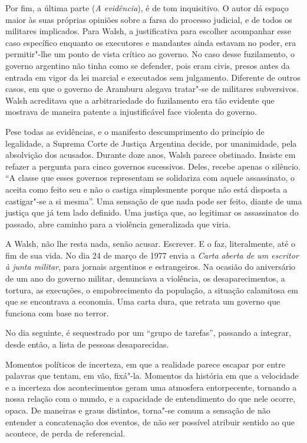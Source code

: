 Por fim, a última parte (\emph{A evidência}), é de tom inquisitivo. O
autor dá espaço maior às suas próprias opiniões sobre a farsa do
processo judicial, e de todos os militares implicados. Para Walsh, a
justificativa para escolher acompanhar esse caso específico enquanto os
executores e mandantes ainda estavam no poder, era permitir"-lhe
um ponto de vista crítico ao governo. No caso desse fuzilamento, o
governo argentino não tinha como se defender, pois eram civis,
presos antes da entrada em vigor da lei marcial e executados sem
julgamento. Diferente de outros casos, em que o governo de Aramburu
alegava tratar"-se de militares subversivos. Walsh acreditava que
a arbitrariedade do fuzilamento era tão evidente que mostrava de
maneira patente a injustificável face violenta do governo.

Pese todas as
evidências, e o manifesto descumprimento do princípio de legalidade, a
Suprema Corte de Justiça Argentina decide, por unanimidade, pela
absolvição dos acusados. Durante doze anos, Walsh parece obstinado.
Insiste em refazer a pergunta para cinco governos sucessivos. Deles,
recebe apenas o silêncio. ``A classe que esses governos representam se
solidariza com aquele assassinato, o aceita como feito seu e não o
castiga simplesmente porque não está disposta a castigar"-se a si
mesma''. Uma sensação de que nada pode ser feito, diante de uma justiça
que já tem lado definido. Uma justiça que, ao legitimar os assassinatos
do passado, abre caminho para a violência generalizada que viria.

A Walsh, não lhe resta nada, senão acusar. Escrever. E o faz,
literalmente, até o fim de sua vida. No dia 24 de março de 1977 envia a
\emph{Carta aberta de um escritor à junta militar}, para jornais
argentinos e estrangeiros. Na ocasião do aniversário de um ano do
governo militar, denunciava a violência, os desaparecimentos, a tortura,
as execuções, o empobrecimento da população, a situação calamitosa em
que se encontrava a economia. Uma carta dura, que retrata um governo que funciona com
base no terror.

No dia seguinte, é sequestrado por um ``grupo de tarefas'', passando a
integrar, desde então, a lista de pessoas desaparecidas.

\asterisc

Momentos políticos de incerteza, em que a realidade parece escapar por
entre palavras que tentam, em vão, fixá"-la. Momentos da história em que
a velocidade e a incerteza dos acontecimentos geram uma atmosfera
entorpecente, tornando a nossa relação com o mundo, e a capacidade de
entendimento do que nele ocorre, opaca. De maneiras e graus distintos,
torna"-se comum a sensação de não entender a concatenação dos eventos, de
não ser possível atribuir sentido ao que acontece, de perda de
referencial.

